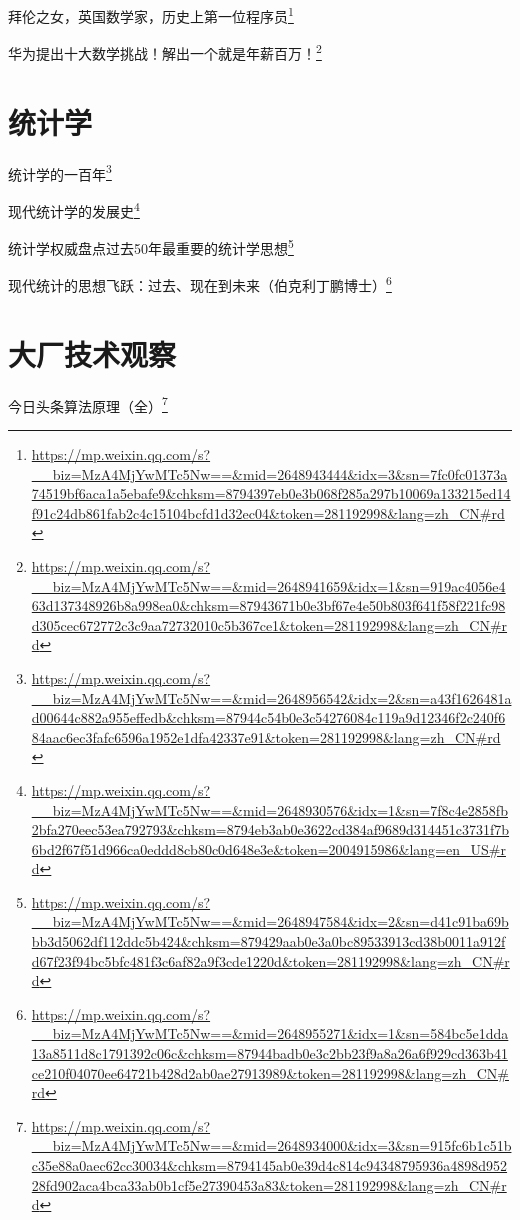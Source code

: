 \documentclass[]{ctexbook}
\renewcommand{\href}[2]{#2\footnote{\url{#1}}}
\begin{document}
\href{https://mp.weixin.qq.com/s?__biz=MzA4MjYwMTc5Nw==\&mid=2648943444\&idx=3\&sn=7fc0fc01373a74519bf6aca1a5ebafe9\&chksm=8794397eb0e3b068f285a297b10069a133215ed14f91c24db861fab2c4c15104bcfd1d32ec04\&token=281192998\&lang=zh_CN\#rd}{拜伦之女，英国数学家，历史上第一位程序员}

\href{https://mp.weixin.qq.com/s?__biz=MzA4MjYwMTc5Nw==\&mid=2648941659\&idx=1\&sn=919ac4056e463d137348926b8a998ea0\&chksm=87943671b0e3bf67e4e50b803f641f58f221fc98d305cec672772c3c9aa72732010c5b367ce1\&token=281192998\&lang=zh_CN\#rd}{华为提出十大数学挑战！解出一个就是年薪百万！}

\hypertarget{ux7edfux8ba1ux5b66-1}{%
\section{统计学}\label{ux7edfux8ba1ux5b66-1}}

\href{https://mp.weixin.qq.com/s?__biz=MzA4MjYwMTc5Nw==\&mid=2648956542\&idx=2\&sn=a43f1626481ad00644c882a955effedb\&chksm=87944c54b0e3c54276084c119a9d12346f2c240f684aac6ec3fafc6596a1952e1dfa42337e91\&token=281192998\&lang=zh_CN\#rd}{统计学的一百年}

\href{https://mp.weixin.qq.com/s?__biz=MzA4MjYwMTc5Nw==\&mid=2648930576\&idx=1\&sn=7f8c4e2858fb2bfa270eec53ea792793\&chksm=8794eb3ab0e3622cd384af9689d314451c3731f7b6bd2f67f51d966ca0eddd8cb80c0d648e3e\&token=2004915986\&lang=en_US\#rd}{现代统计学的发展史}

\href{https://mp.weixin.qq.com/s?__biz=MzA4MjYwMTc5Nw==\&mid=2648947584\&idx=2\&sn=d41c91ba69bbb3d5062df112ddc5b424\&chksm=879429aab0e3a0bc89533913cd38b0011a912fd67f23f94bc5bfc481f3c6af82a9f3cde1220d\&token=281192998\&lang=zh_CN\#rd}{统计学权威盘点过去50年最重要的统计学思想}

\href{https://mp.weixin.qq.com/s?__biz=MzA4MjYwMTc5Nw==\&mid=2648955271\&idx=1\&sn=584bc5e1dda13a8511d8c1791392c06c\&chksm=87944badb0e3c2bb23f9a8a26a6f929cd363b41ce210f04070ee64721b428d2ab0ae27913989\&token=281192998\&lang=zh_CN\#rd}{现代统计的思想飞跃：过去、现在到未来（伯克利丁鹏博士）}

\hypertarget{ux5927ux5382ux6280ux672fux89c2ux5bdf}{%
\section{大厂技术观察}\label{ux5927ux5382ux6280ux672fux89c2ux5bdf}}

\href{https://mp.weixin.qq.com/s?__biz=MzA4MjYwMTc5Nw==\&mid=2648934000\&idx=3\&sn=915fc6b1c51bc35e88a0aec62cc30034\&chksm=8794145ab0e39d4c814c94348795936a4898d95228fd902aca4bca33ab0b1cf5e27390453a83\&token=281192998\&lang=zh_CN\#rd}{今日头条算法原理（全）}
\end{document}
